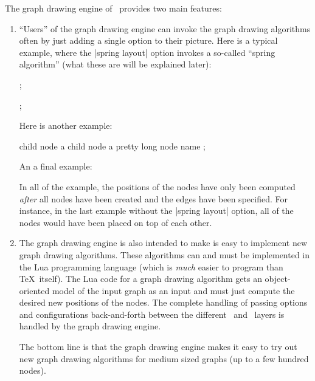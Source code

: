 The graph drawing engine of \tikzname\ provides two main features:
\begin{enumerate}
\item ``Users'' of the graph drawing engine can invoke the graph
  drawing algorithms often by just adding a single option to their
  picture. Here is a typical example, where the |spring layout| option
  invokes a so-called ``spring algorithm'' (what these are will be
  explained later):
\begin{codeexample}[]
\tikz {};

\tikz {};
\end{codeexample}
  Here is another example:
\begin{codeexample}[]
\tikz [tree]
  child { node {a} }
  child { node {a pretty long node name} };
\end{codeexample}
  An a final example:
\begin{codeexample}[]
\end{codeexample}
  In all of the example, the positions of the nodes have only been
  computed \emph{after} all nodes have been created and the edges have
  been specified. For instance, in the last example without the
  |spring layout| option, all of the nodes would have been placed on
  top of each other.
\item The graph drawing engine is also intended to make is easy to
  implement new graph drawing algorithms. These algorithms can and
  must be implemented in the Lua programming language (which is
  \emph{much} easier to program than \TeX\ itself). The Lua code for a
  graph drawing algorithm gets an object-oriented model of the input
  graph as an input and must just compute the desired new positions of
  the nodes. The complete handling of passing options and
  configurations back-and-forth between the different \tikzname\ and
  \pgfname\ layers is handled by the graph drawing engine.

  The bottom line is that the graph drawing engine makes it easy
  to try out new graph drawing algorithms for medium sized graphs (up
  to a few hundred nodes).
\end{enumerate}


